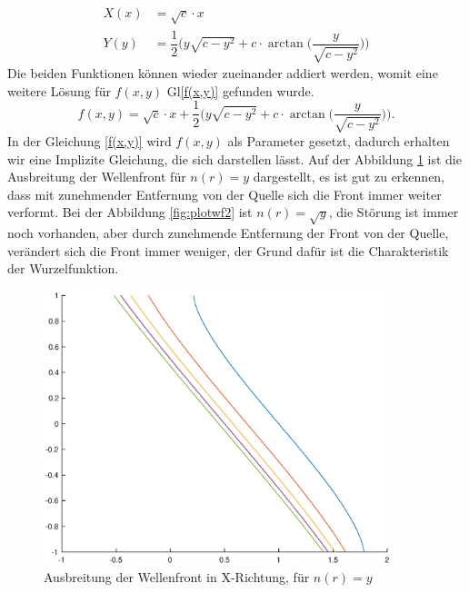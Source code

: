 \begin{refsection}
\begin{align}
\label{X}
X(x)&=\sqrt{c}\cdot x
\\
\label{Y}
Y(y)&=\dfrac{1}{2}\biggl(y \sqrt{c-y^{2}}+c \cdot \arctan\biggl(  \dfrac{y}{\sqrt{c-y^{2}}}\biggr) \biggr) 
\end{align}
Die beiden Funktionen können wieder zueinander addiert werden, womit eine weitere Lösung für $f(x,y)$  Gl\eqref{f(x,y)} gefunden wurde.
\begin{equation}\label{f(x,y)}
f(x,y)= \sqrt{c}\cdot x + \dfrac{1}{2}\biggl(y \sqrt{c-y^{2}}+c \cdot \arctan\biggl(  \dfrac{y}{\sqrt{c-y^{2}}}\biggr) \biggr) .
\end{equation}
In der Gleichung \eqref{f(x,y)} wird $f(x,y)$ als Parameter gesetzt, dadurch erhalten wir eine Implizite Gleichung, die sich darstellen lässt. 
Auf der Abbildung \ref{fig:plotwf1} ist die Ausbreitung der Wellenfront für $n(r)=y$ dargestellt, es ist gut zu erkennen, dass mit zunehmender Entfernung von der Quelle sich die Front immer weiter verformt. Bei der Abbildung \ref{fig:plotwf2} ist $n(r)= \sqrt{y}$, die Störung ist immer noch vorhanden, aber durch zunehmende Entfernung der Front von der Quelle, verändert sich die Front immer weniger, der Grund dafür ist die Charakteristik der Wurzelfunktion.
\begin{figure}
  \centering
  \includegraphics[width=0.9\textwidth]{adaptiv/images/plotwf1}
  \caption{Ausbreitung der Wellenfront in X-Richtung, für $n(r)=y$}
  \label{fig:plotwf1}
\end{figure}


\end{refsection}
